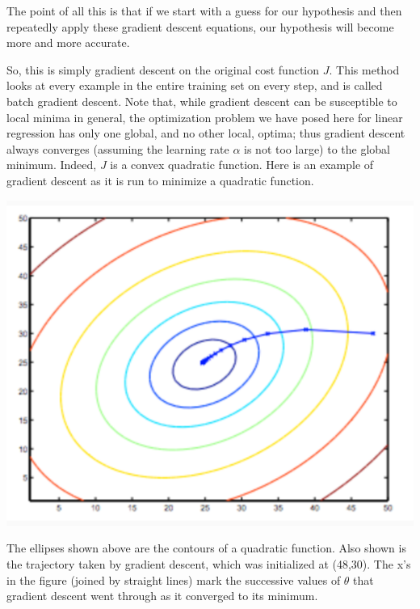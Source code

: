 \documentclass[10pt,a4paper,UTF8]{article}
\begin{document}
The point of all this is that if we start with a guess for our hypothesis and then repeatedly apply these gradient descent equations, our hypothesis will become more and more accurate.

So, this is simply gradient descent on the original cost function \(J\). This method looks at every example in the entire training set on every step, and is called batch gradient descent. Note that, while gradient descent can be susceptible to local minima in general, the optimization problem we have posed here for linear regression has only one global, and no other local, optima; thus gradient descent always converges (assuming the learning rate \(\alpha\) is not too large) to the global minimum. Indeed, \(J\) is a convex quadratic function. Here is an example of gradient descent as it is run to minimize a quadratic function.

\begin{center}
\includegraphics[width=.9\linewidth]{../../img/computer_ng/20171006gradientDescent4.png}
\end{center}


The ellipses shown above are the contours of a quadratic function. Also shown is the trajectory taken by gradient descent, which was initialized at (48,30). The x’s in the figure (joined by straight lines) mark the successive values of \(\theta\) that gradient descent went through as it converged to its minimum.
\end{document}
